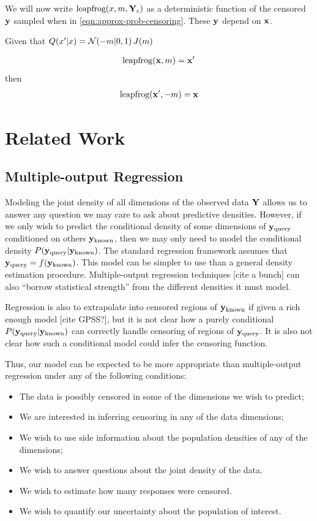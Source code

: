 \documentclass{article}
\begin{document}
We will now write $\textrm{leapfrog}(x, m, \mathbf{Y}_c)$ as a deterministic function of the censored ${\bf{y}}$ sampled when in \eqref{eqn:approx-prob-censoring}.  These ${\bf{y}}$ depend on ${\bf{x}}$.

Given that $Q(x' | x ) = \mathcal{N}\!\left(-m|0,1\right)J(m) $

\begin{align}
\textrm{leapfrog}({\bf{x}}, m) = {\bf{x}}'
\end{align}
then
\begin{align}
\textrm{leapfrog}({\bf{x}}', -m) = {\bf{x}}
\end{align}

\section{Related Work}

\subsection{Multiple-output Regression}

Modeling the joint density of all dimensions of the observed data $\mathbf{Y}$ allows us to answer any question we may care to ask about predictive densities.  However, if we only wish to predict the conditional density of some dimensions of ${\bf{y}}_{\textrm{query}}$ conditioned on others ${\bf{y}}_{\textrm{known}}$, then we may only need to model the conditional density $P( {\bf{y}}_{\textrm{query}} | {\bf{y}}_{\textrm{known}})$.  The standard regression framework assumes that ${\bf{y}}_{\textrm{query}} = f({\bf{y}}_{\textrm{known}})$.  This model can be simpler to use than a general density estimation procedure.  Multiple-output regression techniques [cite a bunch] can also ``borrow statistical strength'' from the different densities it must model.

Regression is also to extrapolate into censored regions of ${\bf{y}}_{\textrm{known}}$ if given a rich enough model [cite GPSS?], but it is not clear how a purely conditional $P( {\bf{y}}_{\textrm{query}} | {\bf{y}}_{\textrm{known}})$ can correctly handle censoring of regions of ${\bf{y}}_{\textrm{query}}$.  It is also not clear how such a conditional model could infer the censoring function.

Thus, our model can be expected to be more appropriate than multiple-output regression under any of the following conditions:
\begin{itemize}
	\item The data is possibly censored in some of the dimensions we wish to predict;
	\item We are interested in inferring censoring in any of the data dimensions;
	\item We wish to use side information about the population densities of any of the dimensions;
	\item We wish to answer questions about the joint density of the data.
	\item We wish to estimate how many responses were censored.
	\item We wish to quantify our uncertainty about the population of interest.
\end{itemize}
\end{document}
